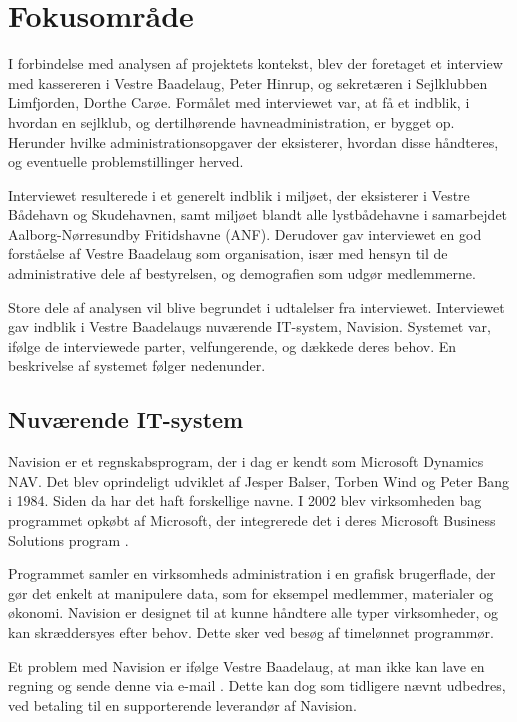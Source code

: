\section{Fokusområde} %

I forbindelse med analysen af projektets kontekst, blev der foretaget et interview med kassereren i Vestre Baadelaug, Peter Hinrup, og sekretæren i Sejlklubben Limfjorden, Dorthe Carøe. Formålet med interviewet var, at få et indblik, i hvordan en sejlklub, og dertilhørende havneadministration, er bygget op. Herunder hvilke administrationsopgaver der eksisterer, hvordan disse håndteres, og eventuelle problemstillinger herved.

Interviewet resulterede i et generelt indblik i miljøet, der eksisterer i Vestre Bådehavn og Skudehavnen, samt miljøet blandt alle lystbådehavne i samarbejdet Aalborg-Nørresundby Fritidshavne (ANF). Derudover gav interviewet en god forståelse af Vestre Baadelaug som organisation, især med hensyn til de administrative dele af bestyrelsen, og demografien som udgør medlemmerne.

Store dele af analysen vil blive begrundet i udtalelser fra interviewet. Interviewet gav indblik i Vestre Baadelaugs nuværende IT-system, Navision. Systemet var, ifølge de interviewede parter, velfungerende, og dækkede deres behov. En beskrivelse af systemet følger nedenunder. 

\subsection{Nuværende IT-system} %
\label{sub:nuv_it_system}

Navision er et regnskabsprogram, der i dag er kendt som Microsoft Dynamics NAV. Det blev oprindeligt udviklet af Jesper Balser, Torben Wind og Peter Bang i 1984. Siden da har det haft forskellige navne. I 2002 blev virksomheden bag programmet opkøbt af Microsoft, der integrerede det i deres Microsoft Business Solutions program \cite{visiondata}.

Programmet samler en virksomheds administration i en grafisk brugerflade, der gør det enkelt at manipulere data, som for eksempel medlemmer, materialer og økonomi. Navision er designet til at kunne håndtere alle typer virksomheder, og kan skræddersyes efter behov. Dette sker ved besøg af timelønnet programmør.

Et problem med Navision er ifølge Vestre Baadelaug, at man ikke kan lave en regning og sende denne via e-mail \cite{int_vb_sl}. Dette kan dog som tidligere nævnt udbedres, ved betaling til en supporterende leverandør af Navision.

